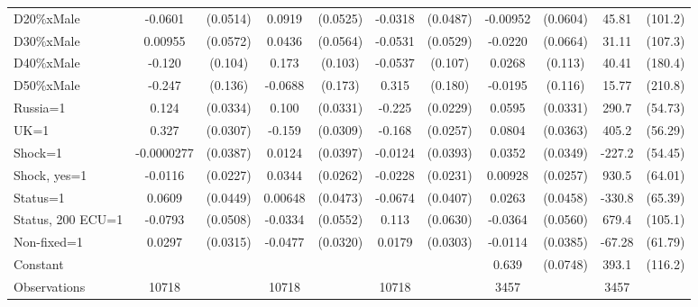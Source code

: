 \begin{tabular}{l|cccccc|cc|cc}
D20\%xMale      &  -0.0601         & (0.0514)&   0.0919\sym{*}  & (0.0525)&  -0.0318         & (0.0487)& -0.00952         & (0.0604)&    45.81         &  (101.2)\\
D30\%xMale      &  0.00955         & (0.0572)&   0.0436         & (0.0564)&  -0.0531         & (0.0529)&  -0.0220         & (0.0664)&    31.11         &  (107.3)\\
D40\%xMale      &   -0.120         &  (0.104)&    0.173\sym{*}  &  (0.103)&  -0.0537         &  (0.107)&   0.0268         &  (0.113)&    40.41         &  (180.4)\\
D50\%xMale      &   -0.247\sym{*}  &  (0.136)&  -0.0688         &  (0.173)&    0.315\sym{*}  &  (0.180)&  -0.0195         &  (0.116)&    15.77         &  (210.8)\\
Russia=1        &    0.124\sym{***}& (0.0334)&    0.100\sym{***}& (0.0331)&   -0.225\sym{***}& (0.0229)&   0.0595\sym{*}  & (0.0331)&    290.7\sym{***}&  (54.73)\\
UK=1            &    0.327\sym{***}& (0.0307)&   -0.159\sym{***}& (0.0309)&   -0.168\sym{***}& (0.0257)&   0.0804\sym{**} & (0.0363)&    405.2\sym{***}&  (56.29)\\
Shock=1         &-0.0000277         & (0.0387)&   0.0124         & (0.0397)&  -0.0124         & (0.0393)&   0.0352         & (0.0349)&   -227.2\sym{***}&  (54.45)\\
Shock, yes=1    &  -0.0116         & (0.0227)&   0.0344         & (0.0262)&  -0.0228         & (0.0231)&  0.00928         & (0.0257)&    930.5\sym{***}&  (64.01)\\
Status=1        &   0.0609         & (0.0449)&  0.00648         & (0.0473)&  -0.0674\sym{*}  & (0.0407)&   0.0263         & (0.0458)&   -330.8\sym{***}&  (65.39)\\
Status, 200 ECU=1&  -0.0793         & (0.0508)&  -0.0334         & (0.0552)&    0.113\sym{*}  & (0.0630)&  -0.0364         & (0.0560)&    679.4\sym{***}&  (105.1)\\
Non-fixed=1     &   0.0297         & (0.0315)&  -0.0477         & (0.0320)&   0.0179         & (0.0303)&  -0.0114         & (0.0385)&   -67.28         &  (61.79)\\
Constant        &                  &         &                  &         &                  &         &    0.639\sym{***}& (0.0748)&    393.1\sym{***}&  (116.2)\\
\hline
Observations    &    10718         &         &    10718         &         &    10718         &         &     3457         &         &     3457         &         \\

\end{tabular}
